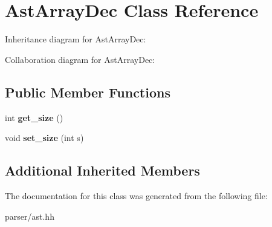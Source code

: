 \hypertarget{classAstArrayDec}{}\section{Ast\+Array\+Dec Class Reference}
\label{classAstArrayDec}


Inheritance diagram for Ast\+Array\+Dec\+:


Collaboration diagram for Ast\+Array\+Dec\+:
\subsection*{Public Member Functions}
\begin{DoxyCompactItemize}
\item 
\mbox{\label{classAstArrayDec_a8b2131d0ab90b40afa2b9cc0f459b624}} 
int {\bfseries get\+\_\+size} ()
\item 
\mbox{\label{classAstArrayDec_a99fa166ef86f5f80038860dc0d8c64ec}} 
void {\bfseries set\+\_\+size} (int s)
\end{DoxyCompactItemize}
\subsection*{Additional Inherited Members}


The documentation for this class was generated from the following file\+:\begin{DoxyCompactItemize}
\item 
parser/ast.\+hh\end{DoxyCompactItemize}

